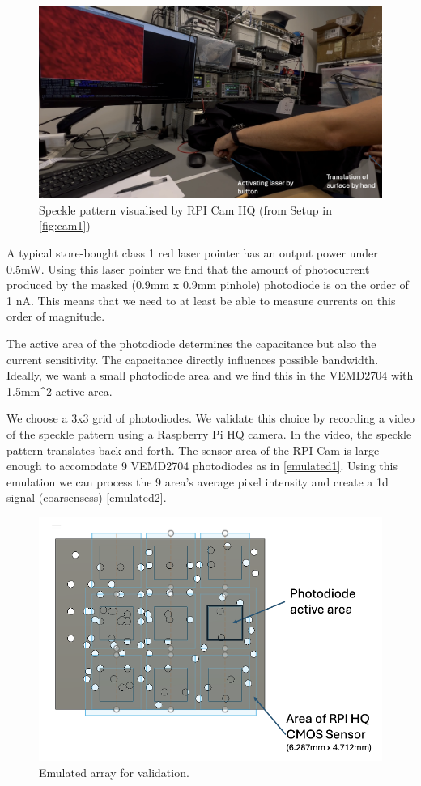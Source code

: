 \begin{figure}[t]
  \centering
  \includegraphics[width=\widthnarrow]{figures/impl/camera_setup2.png}
  \caption{Speckle pattern visualised by RPI Cam HQ (from Setup in \ref{fig:cam1})}
  \label{fig:cam2}
\end{figure}

A typical store-bought class 1 red laser pointer has an output power under 0.5mW. Using this laser pointer we find that the amount of photocurrent produced by the masked (0.9mm x 0.9mm pinhole) photodiode is on the order of 1 nA. This means that we need to at least be able to measure currents on this order of magnitude.

The active area of the photodiode determines the capacitance but also the current sensitivity. The capacitance directly influences possible bandwidth. Ideally, we want a small photodiode area and we find this in the VEMD2704 with 1.5mm^2 active area.

We choose a 3x3 grid of photodiodes. We validate this choice by recording a video of the speckle pattern using a Raspberry Pi HQ camera. In the video, the speckle pattern translates back and forth. The sensor area of the RPI Cam is large enough to accomodate 9 VEMD2704 photodiodes as in \ref{emulated1}. Using this emulation we can process the 9 area's average pixel intensity and create a 1d signal (coarsensess) \ref{emulated2}.

\begin{figure}[t]
  \centering
  \includegraphics[width=\widthnarrow]{figures/impl/emulated1.png}
  \caption{Emulated array for validation.}
  \label{fig:emulated1}
\end{figure}

